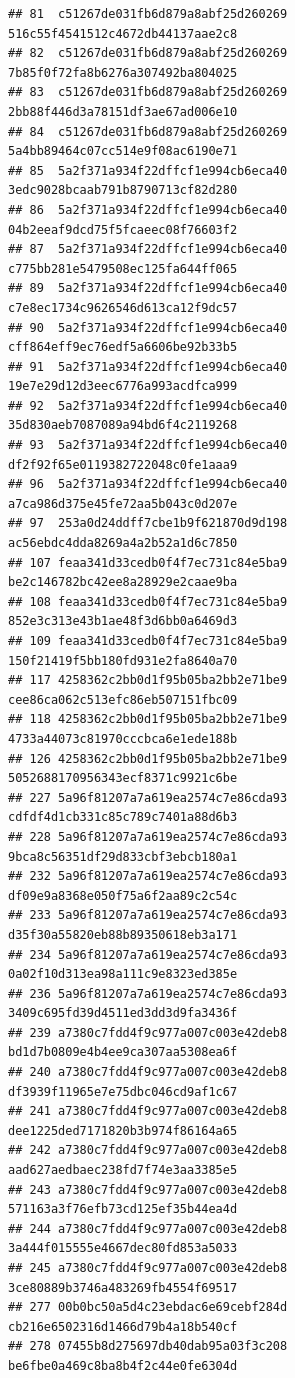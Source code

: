 \documentclass[]{article}
\begin{document}
\begin{verbatim}
## 81  c51267de031fb6d879a8abf25d260269   516c55f4541512c4672db44137aae2c8
## 82  c51267de031fb6d879a8abf25d260269   7b85f0f72fa8b6276a307492ba804025
## 83  c51267de031fb6d879a8abf25d260269   2bb88f446d3a78151df3ae67ad006e10
## 84  c51267de031fb6d879a8abf25d260269   5a4bb89464c07cc514e9f08ac6190e71
## 85  5a2f371a934f22dffcf1e994cb6eca40   3edc9028bcaab791b8790713cf82d280
## 86  5a2f371a934f22dffcf1e994cb6eca40   04b2eeaf9dcd75f5fcaeec08f76603f2
## 87  5a2f371a934f22dffcf1e994cb6eca40   c775bb281e5479508ec125fa644ff065
## 89  5a2f371a934f22dffcf1e994cb6eca40   c7e8ec1734c9626546d613ca12f9dc57
## 90  5a2f371a934f22dffcf1e994cb6eca40   cff864eff9ec76edf5a6606be92b33b5
## 91  5a2f371a934f22dffcf1e994cb6eca40   19e7e29d12d3eec6776a993acdfca999
## 92  5a2f371a934f22dffcf1e994cb6eca40   35d830aeb7087089a94bd6f4c2119268
## 93  5a2f371a934f22dffcf1e994cb6eca40   df2f92f65e0119382722048c0fe1aaa9
## 96  5a2f371a934f22dffcf1e994cb6eca40   a7ca986d375e45fe72aa5b043c0d207e
## 97  253a0d24ddff7cbe1b9f621870d9d198   ac56ebdc4dda8269a4a2b52a1d6c7850
## 107 feaa341d33cedb0f4f7ec731c84e5ba9   be2c146782bc42ee8a28929e2caae9ba
## 108 feaa341d33cedb0f4f7ec731c84e5ba9   852e3c313e43b1ae48f3d6bb0a6469d3
## 109 feaa341d33cedb0f4f7ec731c84e5ba9   150f21419f5bb180fd931e2fa8640a70
## 117 4258362c2bb0d1f95b05ba2bb2e71be9   cee86ca062c513efc86eb507151fbc09
## 118 4258362c2bb0d1f95b05ba2bb2e71be9   4733a44073c81970cccbca6e1ede188b
## 126 4258362c2bb0d1f95b05ba2bb2e71be9   5052688170956343ecf8371c9921c6be
## 227 5a96f81207a7a619ea2574c7e86cda93   cdfdf4d1cb331c85c789c7401a88d6b3
## 228 5a96f81207a7a619ea2574c7e86cda93   9bca8c56351df29d833cbf3ebcb180a1
## 232 5a96f81207a7a619ea2574c7e86cda93   df09e9a8368e050f75a6f2aa89c2c54c
## 233 5a96f81207a7a619ea2574c7e86cda93   d35f30a55820eb88b89350618eb3a171
## 234 5a96f81207a7a619ea2574c7e86cda93   0a02f10d313ea98a111c9e8323ed385e
## 236 5a96f81207a7a619ea2574c7e86cda93   3409c695fd39d4511ed3dd3d9fa3436f
## 239 a7380c7fdd4f9c977a007c003e42deb8   bd1d7b0809e4b4ee9ca307aa5308ea6f
## 240 a7380c7fdd4f9c977a007c003e42deb8   df3939f11965e7e75dbc046cd9af1c67
## 241 a7380c7fdd4f9c977a007c003e42deb8   dee1225ded7171820b3b974f86164a65
## 242 a7380c7fdd4f9c977a007c003e42deb8   aad627aedbaec238fd7f74e3aa3385e5
## 243 a7380c7fdd4f9c977a007c003e42deb8   571163a3f76efb73cd125ef35b44ea4d
## 244 a7380c7fdd4f9c977a007c003e42deb8   3a444f015555e4667dec80fd853a5033
## 245 a7380c7fdd4f9c977a007c003e42deb8   3ce80889b3746a483269fb4554f69517
## 277 00b0bc50a5d4c23ebdac6e69cebf284d   cb216e6502316d1466d79b4a18b540cf
## 278 07455b8d275697db40dab95a03f3c208   be6fbe0a469c8ba8b4f2c44e0fe6304d

\end{verbatim}
\end{document}

